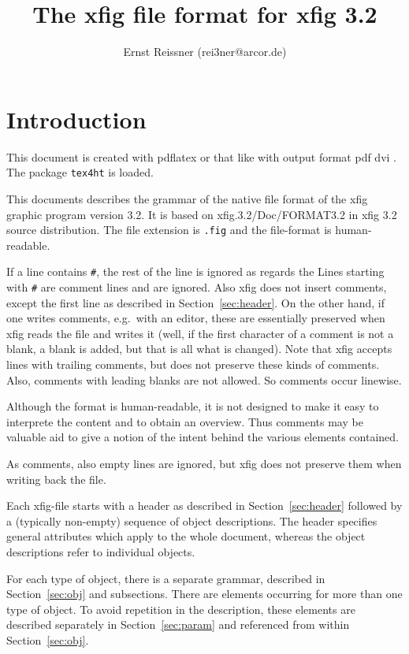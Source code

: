 \documentclass[10pt, a4paper]{article}
\title{The xfig file format for xfig 3.2 }
\author{Ernst Reissner (rei3ner@arcor.de)}
\begin{document}
\maketitle
\tableofcontents

\section{Introduction}

This document is created with pdflatex or that like 
with output format 
\ifpdf%
pdf%
\else
dvi%
\fi.
The package \texttt{tex4ht} 
is  loaded. 

This documents describes the grammar 
of the native file format of the xfig graphic program version 3.2. 
It is based on xfig.3.2/Doc/FORMAT3.2 in xfig 3.2 source distribution. 
The file extension is \texttt{.fig} and the file-format is human-readable. 

If a line contains \texttt{\#}, 
the rest of the line is ignored as regards the 
Lines starting with \texttt{\#} are comment lines and are ignored. 
Also xfig does not insert comments, 
except the first line as described in Section~\ref{sec:header}. 
On the other hand, if one writes comments, e.g.~with an editor, 
these are essentially preserved when xfig reads the file and writes it 
(well, if the first character of a comment is not a blank, 
a blank is added, but that is all what is changed). 
Note that xfig accepts lines with trailing comments, 
but does not preserve these kinds of comments. 
Also, comments with leading blanks are not allowed. 
So comments occur linewise. 

Although the format is human-readable, 
it is not designed to make it easy to interprete the content 
and to obtain an overview. 
Thus comments may be valuable aid to give a notion 
of the intent behind the various elements contained. 

As comments, also empty lines are ignored, 
but xfig does not preserve them when writing back the file. 

Each xfig-file starts with a header as described in Section~\ref{sec:header} 
followed by a (typically non-empty) sequence of object descriptions. 
The header specifies general attributes which apply to the whole document, 
whereas the object descriptions refer to individual objects. 

For each type of object, there is a separate grammar, 
described in Section~\ref{sec:obj} and subsections. 
There are elements occurring for more than one type of object. 
To avoid repetition in the description, 
these elements are described separately in Section~\ref{sec:param} 
and referenced from within Section~\ref{sec:obj}. 
\end{document}
